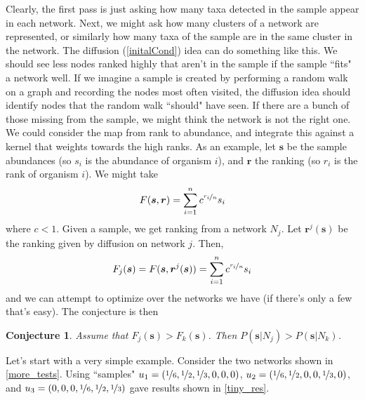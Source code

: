 \documentclass[10pt]{article}
\newtheorem{conj}{Conjecture}
\theoremstyle{definition}
\numberwithin{theorem}{section}
\numberwithin{definition}{section}
\numberwithin{lemma}{section}
\numberwithin{corollary}{section}
\numberwithin{clm}{section}
\numberwithin{rmk}{section}
\newcommand{\nhalf}{\nicefrac{1}{2}}
\renewcommand{\b}{\bm}
\begin{document}
Clearly, the first pass is just asking how many taxa detected in the sample appear in each network. Next, we might ask how many clusters of a network are represented, or similarly how many taxa of the sample are in the same cluster in the network. The diffusion (\cref{initalCond}) idea can do something like this. We should see less nodes ranked highly that aren't in the sample if the sample ``fits" a network well. If we imagine a sample is created by performing a random walk on a graph and recording the nodes most often visited, the diffusion idea should identify nodes that the random walk ``should" have seen. If there are a bunch of those missing from the sample, we might think the network is not the right one. We could consider the map from rank to abundance, and integrate this against a kernel that weights towards the high ranks. As an example, let $\b{s}$ be the sample abundances (so $s_i$ is the abundance of organism $i$), and $\b{r}$ the ranking (so $r_i$ is the rank of organism $i$). We might take 
\[
F(\b{s},\b{r}) = \sum_{i=1}^n c^{\nicefrac{r_i}{n}} s_i
\]
where $c<1$. Given a sample, we get ranking from a network $N_j$. Let $\b{r}^j(\b{s})$ be the ranking given by diffusion on network $j$. Then,
\[
F_j(\b{s}) = F(\b{s},\b{r}^j(\b{s})) = \sum_{i=1}^n c^{\nicefrac{r_i}{n}} s_i
\]
and we can attempt to optimize over the networks we have (if there's only a few that's easy). The conjecture is then
\begin{conj}
	Assume that $F_j(\b{s}) > F_k(\b{s})$. Then $P(\b{s}|N_j) > P(\b{s}|N_k)$.
\end{conj}



Let's start with a very simple example. Consider the two networks shown in \cref{more_tests}. Using ``samples" $u_1 = (\nicefrac{1}{6},\nhalf,\nicefrac{1}{3},0,0,0)$, $u_2 = (\nicefrac{1}{6},\nhalf,0,0,\nicefrac{1}{3},0)$, and $u_3= (0,0,0,\nicefrac{1}{6},\nhalf,\nicefrac{1}{3})$ gave results shown in \cref{tiny_res}.
\end{document}
